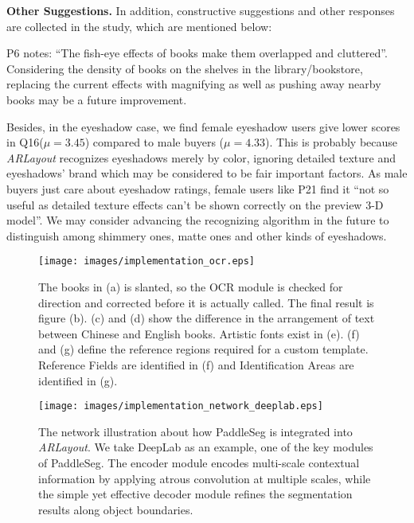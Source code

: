 \textbf{Other Suggestions.} In addition, constructive suggestions and other responses are collected in the study,
which are mentioned below:

P6 notes: ``The fish-eye effects of books make them overlapped and cluttered''.
Considering the density of books on the shelves in the library/bookstore,
replacing the current effects with
magnifying as well as pushing away nearby books may be a future improvement.

Besides, in the eyeshadow case, we find female eyeshadow users give lower scores in Q16($\mu = 3.45$)
compared to male buyers ($\mu = 4.33$). This is probably because
\textit{ARLayout} recognizes eyeshadows merely by color, ignoring detailed texture and eyeshadows' brand which
may be considered to be fair important factors. As male buyers just care about
eyeshadow ratings, female users like P21 find it ``not so useful as detailed texture effects
can't be shown correctly on the preview 3-D model''. We may consider advancing the recognizing
algorithm in the future to distinguish among shimmery ones, matte ones and other kinds of eyeshadows.

\begin{figure}[htp]
    \centering
    \texttt{[image: images/implementation\_ocr.eps]}
    \caption{
        The books in (a) is slanted,
        so the OCR module is checked for direction and corrected before it is actually called.
        The final result is figure (b).
        (c) and (d) show the difference in the arrangement of text between Chinese and English books.
        Artistic fonts exist in (e).
        (f) and (g) define the reference regions required for a custom template.
        Reference Fields are identified in (f) and Identification Areas are identified in (g).
    }
    \label{fig:implementation_ocr}
\end{figure}

\begin{figure*}[htp]
        \centering
        \texttt{[image: images/implementation\_network\_deeplab.eps]}
        \caption{
            The network illustration about how PaddleSeg is integrated into \textit{ARLayout}.
            We take DeepLab as an example, one of the key modules of PaddleSeg.
            The encoder module encodes multi-scale contextual information by
            applying atrous convolution at multiple scales, while the simple yet effective decoder
            module refines the segmentation results along object boundaries.
        }
        \label{fig:implementation_network_deeplab}
    \end{figure*}